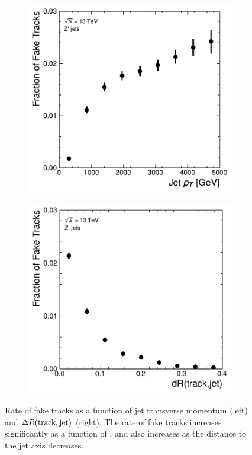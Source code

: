 \begin{figure}[!htbp]
  \centering
  \begin{subfigure}[b]{0.48\textwidth}
      \centering
      \includegraphics[width=\textwidth]{chapters/track_classifier/figs/fake_vs_pt.pdf}
  \end{subfigure}
  \quad
  \begin{subfigure}[b]{0.48\textwidth}
      \centering
      \includegraphics[width=\textwidth]{chapters/track_classifier/figs/fake_vs_dr.pdf}
  \end{subfigure}
  \caption{
    Rate of fake tracks as a function of jet transverse momentum (left) and $\Delta R(\textnormal{track}, \textnormal{jet})$ (right).
    The rate of fake tracks increases significantly as a function of \pt, and also increases as the distance to the jet axis decreases.
  }
  \label{fig:fakerate_vs}
\end{figure}

